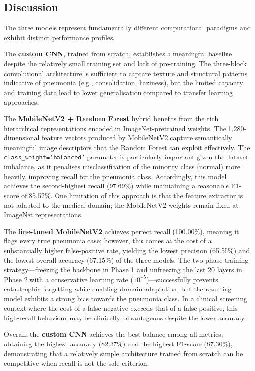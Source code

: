 \documentclass[conference]{IEEEtran}
\begin{document}
\subsection{Discussion}

The three models represent fundamentally different
computational paradigms and exhibit distinct performance
profiles.

The \textbf{custom CNN}, trained from scratch, establishes a
meaningful baseline despite the relatively small training
set and lack of pre-training. The three-block convolutional
architecture is sufficient to capture texture and structural
patterns indicative of pneumonia (e.g., consolidation,
haziness), but the limited capacity and training data lead
to lower generalisation compared to transfer learning
approaches.

The \textbf{MobileNetV2 + Random Forest} hybrid benefits
from the rich hierarchical representations encoded in
ImageNet-pretrained weights. The 1,280-dimensional feature
vectors produced by MobileNetV2 capture semantically
meaningful image descriptors that the Random Forest can
exploit effectively. The \texttt{class\_weight='balanced'}
parameter is particularly important given the dataset
imbalance, as it penalises misclassification of the minority
class (normal) more heavily, improving recall for the
pneumonia class. Accordingly, this model achieves the
second-highest recall (97.69\%) while maintaining a
reasonable F1-score of 85.52\%. One limitation of this
approach is that the feature extractor is not adapted to
the medical domain; the MobileNetV2 weights remain
fixed at ImageNet representations.

The \textbf{fine-tuned MobileNetV2} achieves perfect recall
(100.00\%), meaning it flags every true pneumonia case;
however, this comes at the cost of a substantially higher
false-positive rate, yielding the lowest precision (65.55\%)
and the lowest overall accuracy (67.15\%) of the three
models. The two-phase training strategy—freezing the
backbone in Phase 1 and unfreezing the last 20 layers in
Phase 2 with a conservative learning rate ($10^{-5}$)—successfully
prevents catastrophic forgetting while enabling domain
adaptation, but the resulting model exhibits a strong
bias towards the pneumonia class. In a clinical screening
context where the cost of a false negative exceeds that of a
false positive, this high-recall behaviour may be clinically
advantageous despite the lower accuracy.

Overall, the \textbf{custom CNN} achieves the best balance
among all metrics, obtaining the highest accuracy (82.37\%)
and the highest F1-score (87.30\%), demonstrating that a
relatively simple architecture trained from scratch can be
competitive when recall is not the sole criterion.
\end{document}
